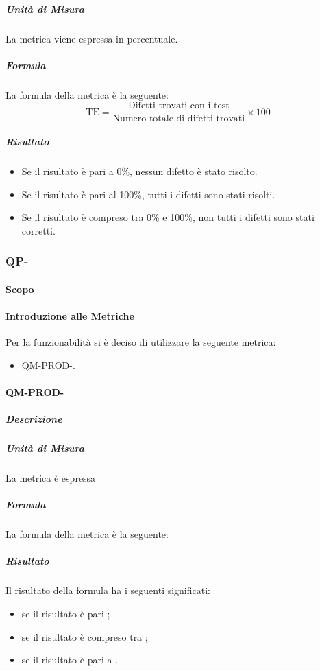 			\subparagraph{Unità di Misura}
			La metrica viene espressa in percentuale.

			\subparagraph{Formula}
			La formula della metrica è la seguente:
			\[
				\text{TE} = \frac{\text{Difetti trovati con i test}}{\text{Numero totale di difetti trovati}} \times 100
			\]

			\subparagraph{Risultato}
			\begin{itemize}
				\item Se il risultato è pari a 0\%, nessun difetto è stato risolto.
				\item Se il risultato è pari al 100\%, tutti i difetti sono stati risolti.
				\item Se il risultato è compreso tra 0\% e 100\%, non tutti i difetti sono stati corretti.
			\end{itemize}



			\subsubsection{QP-}
				\paragraph{Scopo}
				\paragraph{Introduzione alle Metriche}
					Per la funzionabilità si è deciso di utilizzare la seguente metrica:
					\begin{itemize}
						\item QM-PROD-.
					\end{itemize}
				\paragraph{QM-PROD-}
					\subparagraph{Descrizione}

					\subparagraph{Unità di Misura}
						La metrica è espressa
					\subparagraph{Formula}
						La formula della metrica è la seguente:
					\subparagraph{Risultato}
						Il risultato della formula ha i seguenti significati:
						\begin{itemize}
							\item se il risultato è pari ;
							\item se il risultato è compreso tra ;
							\item se il risultato è pari a .
						\end{itemize}



